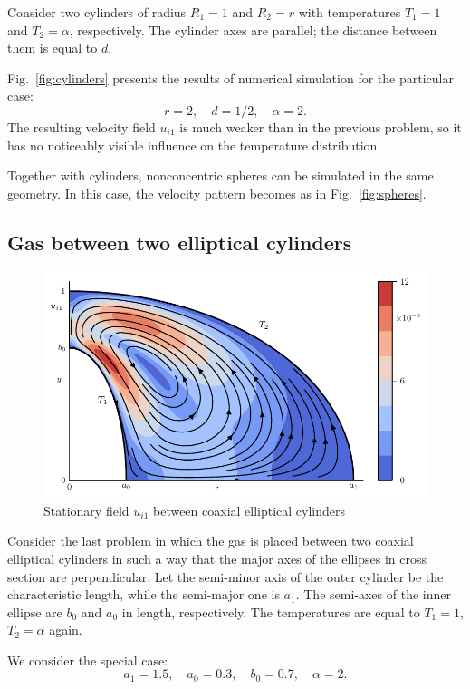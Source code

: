\documentclass[smallextended, referee]{svjour3} %
\begin{document}
Consider two cylinders of radius \(R_1 = 1\) and \(R_2 = r\)
with temperatures \(T_1 = 1\) and \(T_2 = \alpha\), respectively.
The cylinder axes are parallel; the distance between them is equal to \(d\).

Fig.~\ref{fig:cylinders} presents the results of numerical simulation for the particular case:
\[ r = 2, \quad d = 1/2, \quad \alpha = 2. \]
The resulting velocity field \(u_{i1}\) is much weaker than in the previous problem,
so it has no noticeably visible influence on the temperature distribution.

Together with cylinders, nonconcentric spheres can be simulated in the same geometry.
In this case, the velocity pattern becomes as in Fig.~\ref{fig:spheres}.

\subsection{Gas between two elliptical cylinders}

\begin{figure}
	\centering
	\includegraphics{Fig9}
	\caption{Stationary field \(u_{i1}\) between coaxial elliptical cylinders}
	\label{fig:elliptic}
\end{figure}

Consider the last problem in which the gas is placed between two coaxial elliptical cylinders
in such a way that the major axes of the ellipses in cross section are perpendicular.
Let the semi-minor axis of the outer cylinder be the characteristic length, while the semi-major one is \(a_1\).
The semi-axes of the inner ellipse are \(b_0\) and \(a_0\) in length, respectively.
The temperatures are equal to \(T_1 = 1\), \(T_2 = \alpha\) again.

We consider the special case:
\[ a_1 = 1.5, \quad a_0 = 0.3, \quad b_0 = 0.7, \quad \alpha = 2. \]
\end{document}
